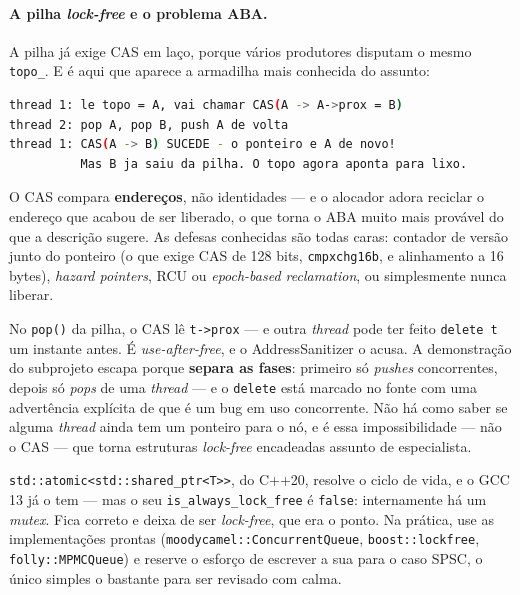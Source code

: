 \paragraph{A pilha \emph{lock-free} e o problema ABA.} A pilha já exige CAS em
laço, porque vários produtores disputam o mesmo \texttt{topo\_}. E é aqui que
aparece a armadilha mais conhecida do assunto:

\begin{lstlisting}[style=bt, language=bash,
    caption={O problema ABA, como o subprojeto o descreve.}]
thread 1: le topo = A, vai chamar CAS(A -> A->prox = B)
thread 2: pop A, pop B, push A de volta
thread 1: CAS(A -> B) SUCEDE - o ponteiro e A de novo!
          Mas B ja saiu da pilha. O topo agora aponta para lixo.
\end{lstlisting}

O CAS compara \textbf{endereços}, não identidades --- e o alocador adora
reciclar o endereço que acabou de ser liberado, o que torna o ABA muito mais
provável do que a descrição sugere. As defesas conhecidas são todas caras:
contador de versão junto do ponteiro (o que exige CAS de 128 bits,
\texttt{cmpxchg16b}, e alinhamento a 16 bytes), \emph{hazard pointers}, RCU ou
\emph{epoch-based reclamation}, ou simplesmente nunca liberar.

\begin{armadilha}
No \texttt{pop()} da pilha, o CAS lê \texttt{t->prox} --- e outra \emph{thread}
pode ter feito \texttt{delete t} um instante antes. É \emph{use-after-free}, e o
AddressSanitizer o acusa. A demonstração do subprojeto escapa porque
\textbf{separa as fases}: primeiro só \emph{pushes} concorrentes, depois só
\emph{pops} de uma \emph{thread} --- e o \texttt{delete} está marcado no fonte
com uma advertência explícita de que é um bug em uso concorrente. Não há como
saber se alguma \emph{thread} ainda tem um ponteiro para o nó, e é essa
impossibilidade --- não o CAS --- que torna estruturas \emph{lock-free}
encadeadas assunto de especialista.
\end{armadilha}

\texttt{std::atomic<std::shared\_ptr<T>>}, do C++20, resolve o ciclo de vida, e
o GCC 13 já o tem --- mas o seu \texttt{is\_always\_lock\_free} é
\texttt{false}: internamente há um \emph{mutex}. Fica correto e deixa de ser
\emph{lock-free}, que era o ponto. Na prática, use as implementações prontas
(\texttt{moodycamel::ConcurrentQueue}, \texttt{boost::lockfree},
\texttt{folly::MPMCQueue}) e reserve o esforço de escrever a sua para o caso
SPSC, o único simples o bastante para ser revisado com calma.

